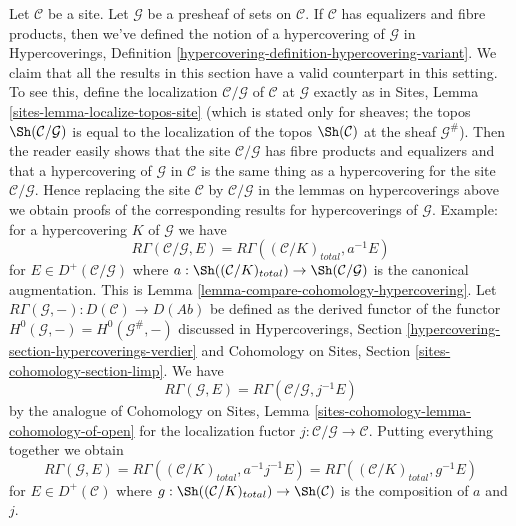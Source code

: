 \begin{remark}
\label{remark-compare-cohomology-hypercovering-presheaf}
Let $\mathcal{C}$ be a site. Let $\mathcal{G}$ be a presheaf of sets on
$\mathcal{C}$. If $\mathcal{C}$ has equalizers and fibre products, then
we've defined the notion of a hypercovering of $\mathcal{G}$ in
Hypercoverings, Definition \ref{hypercovering-definition-hypercovering-variant}.
We claim that all the results in this section have a
valid counterpart in this setting.
To see this,
define the localization $\mathcal{C}/\mathcal{G}$
of $\mathcal{C}$ at $\mathcal{G}$ exactly as in
Sites, Lemma \ref{sites-lemma-localize-topos-site}
(which is stated only for sheaves; the topos
$\Sh(\mathcal{C}/\mathcal{G})$ is equal to the localization
of the topos $\Sh(\mathcal{C})$ at the sheaf $\mathcal{G}^\#$).
Then the reader easily shows that the site
$\mathcal{C}/\mathcal{G}$ has fibre products and equalizers
and that a hypercovering of $\mathcal{G}$ in $\mathcal{C}$
is the same thing as a hypercovering for the site $\mathcal{C}/\mathcal{G}$.
Hence replacing the site $\mathcal{C}$ by $\mathcal{C}/\mathcal{G}$
in the lemmas on hypercoverings above we obtain proofs of the
corresponding results for hypercoverings of $\mathcal{G}$.
Example: for a hypercovering $K$ of $\mathcal{G}$ we have
$$
R\Gamma(\mathcal{C}/\mathcal{G}, E) =
R\Gamma((\mathcal{C}/K)_{total}, a^{-1}E)
$$
for $E \in D^+(\mathcal{C}/\mathcal{G})$ where
$a : \Sh((\mathcal{C}/K)_{total}) \to \Sh(\mathcal{C}/\mathcal{G})$
is the canonical augmentation. This is
Lemma \ref{lemma-compare-cohomology-hypercovering}.
Let $R\Gamma(\mathcal{G}, -) : D(\mathcal{C}) \to D(\textit{Ab})$
be defined as the derived functor of the functor
$H^0(\mathcal{G}, -) = H^0(\mathcal{G}^\#, -)$
discussed in Hypercoverings, Section
\ref{hypercovering-section-hypercoverings-verdier} and
Cohomology on Sites, Section \ref{sites-cohomology-section-limp}.
We have
$$
R\Gamma(\mathcal{G}, E) = R\Gamma(\mathcal{C}/\mathcal{G}, j^{-1}E)
$$
by the analogue of Cohomology on Sites, Lemma
\ref{sites-cohomology-lemma-cohomology-of-open}
for the localization fuctor $j : \mathcal{C}/\mathcal{G} \to \mathcal{C}$.
Putting everything together we obtain
$$
R\Gamma(\mathcal{G}, E) =
R\Gamma((\mathcal{C}/K)_{total}, a^{-1}j^{-1}E) =
R\Gamma((\mathcal{C}/K)_{total}, g^{-1}E)
$$
for $E \in D^+(\mathcal{C})$ where
$g : \Sh((\mathcal{C}/K)_{total}) \to \Sh(\mathcal{C})$
is the composition of $a$ and $j$.
\end{remark}







